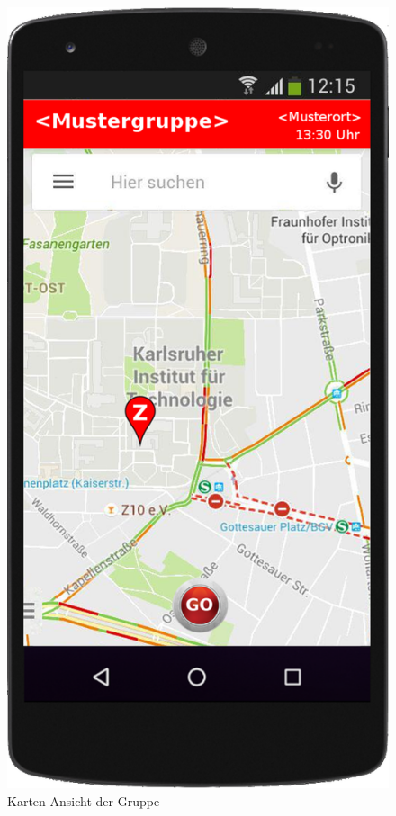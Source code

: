 \begin{figure}
	\includegraphics[scale=0.2]{resources/images/handy/map.png}
	\caption{Karten-Ansicht der Gruppe}
\end{figure}

